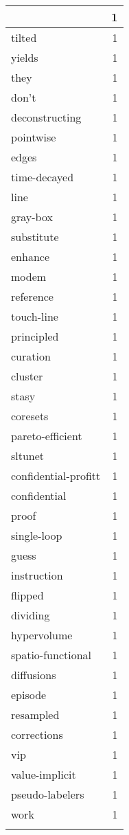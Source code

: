 \begin{table}[h]
\begin{tabular}{|l|r|}
{multi-resolution & 1 \\
\hline
tilted & 1 \\
\hline
yields & 1 \\
\hline
they & 1 \\
\hline
don't & 1 \\
\hline
deconstructing & 1 \\
\hline
pointwise & 1 \\
\hline
edges & 1 \\
\hline
time-decayed & 1 \\
\hline
line & 1 \\
\hline
gray-box & 1 \\
\hline
substitute & 1 \\
\hline
enhance & 1 \\
\hline
modem & 1 \\
\hline
reference & 1 \\
\hline
touch-line & 1 \\
\hline
principled & 1 \\
\hline
curation & 1 \\
\hline
cluster & 1 \\
\hline
stasy & 1 \\
\hline
coresets & 1 \\
\hline
pareto-efficient & 1 \\
\hline
sltunet & 1 \\
\hline
confidential-profitt & 1 \\
\hline
confidential & 1 \\
\hline
proof & 1 \\
\hline
single-loop & 1 \\
\hline
guess & 1 \\
\hline
instruction & 1 \\
\hline
flipped & 1 \\
\hline
dividing & 1 \\
\hline
hypervolume & 1 \\
\hline
spatio-functional & 1 \\
\hline
diffusions & 1 \\
\hline
episode & 1 \\
\hline
resampled & 1 \\
\hline
corrections & 1 \\
\hline
vip & 1 \\
\hline
value-implicit & 1 \\
\hline
pseudo-labelers & 1 \\
\hline
work & 1 \\
}
\end{tabular}
\end{table}
